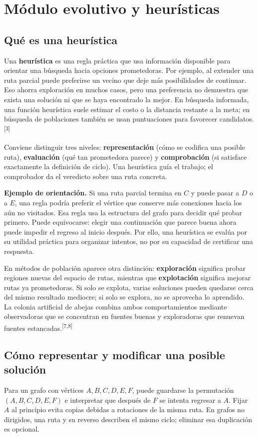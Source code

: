 \documentclass[11pt,letterpaper]{article}
\newcommand{\src}[1]{\textsuperscript{\textcolor{cian}{[#1]}}}
\begin{document}
\section{Módulo evolutivo y heurísticas}
\subsection{Qué es una heurística}
Una \textbf{heurística} es una regla práctica que usa información disponible para orientar una búsqueda hacia opciones prometedoras. Por ejemplo, al extender una ruta parcial puede preferirse un vecino que deje más posibilidades de continuar. Eso ahorra exploración en muchos casos, pero una preferencia no demuestra que exista una solución ni que se haya encontrado la mejor. En búsqueda informada, una función heurística suele estimar el costo o la distancia restante a la meta; en búsqueda de poblaciones también se usan puntuaciones para favorecer candidatos.\src{3}

Conviene distinguir tres niveles: \textbf{representación} (cómo se codifica una posible ruta), \textbf{evaluación} (qué tan prometedora parece) y \textbf{comprobación} (si satisface exactamente la definición de ciclo). Una heurística guía el trabajo; el comprobador da el veredicto sobre una ruta concreta.

\textbf{Ejemplo de orientación.} Si una ruta parcial termina en $C$ y puede pasar a $D$ o a $E$, una regla podría preferir el vértice que conserve más conexiones hacia los aún no visitados. Esa regla usa la estructura del grafo para decidir qué probar primero. Puede equivocarse: elegir una continuación que parece buena ahora puede impedir el regreso al inicio después. Por ello, una heurística se evalúa por su utilidad práctica para organizar intentos, no por su capacidad de certificar una respuesta.

En métodos de población aparece otra distinción: \textbf{exploración} significa probar regiones nuevas del espacio de rutas, mientras que \textbf{explotación} significa mejorar rutas ya prometedoras. Si solo se explota, varias soluciones pueden quedarse cerca del mismo resultado mediocre; si solo se explora, no se aprovecha lo aprendido. La colonia artificial de abejas combina ambos comportamientos mediante observadoras que se concentran en fuentes buenas y exploradoras que renuevan fuentes estancadas.\src{7,8}

\subsection{Cómo representar y modificar una posible solución}
Para un grafo con vértices $A,B,C,D,E,F$, puede guardarse la permutación $(A,B,C,D,E,F)$ e interpretar que después de $F$ se intenta regresar a $A$. Fijar $A$ al principio evita copias debidas a rotaciones de la misma ruta. En grafos no dirigidos, una ruta y su reverso describen el mismo ciclo; eliminar esa duplicación es opcional.
\end{document}
